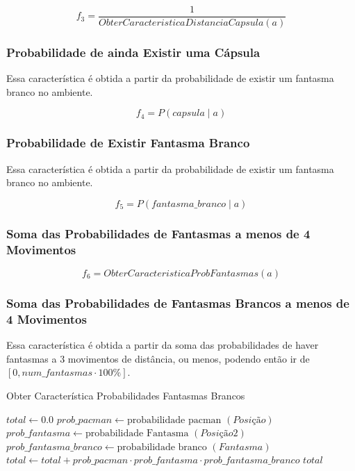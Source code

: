 $$ f_3 = \frac{1}{ObterCaracteristicaDistanciaCapsula \left( a \right)} $$

\subsubsection*{Probabilidade de ainda Existir uma Cápsula}

Essa característica é obtida a partir da probabilidade de existir um fantasma branco no ambiente.

$$ f_4 = P \left( capsula \mid a \right) $$

\subsubsection*{Probabilidade de Existir Fantasma Branco}

Essa característica é obtida a partir da probabilidade de existir um fantasma branco no ambiente.

$$ f_5 = P \left( fantasma\_branco \mid a \right) $$

\subsubsection*{Soma das Probabilidades de Fantasmas a menos de 4 Movimentos}

$$ f_6 = ObterCaracteristicaProbFantasmas \left( a \right) $$

\subsubsection*{Soma das Probabilidades de Fantasmas Brancos a menos de 4 Movimentos}

Essa característica é obtida a partir da soma das probabilidades de haver fantasmas a 3 movimentos de distância, ou menos, podendo então ir de $ \left[ 0, num\_fantasmas \cdot 100\% \right] $.

\begin{algorithm}[H]
	\caption{Obter Característica Probabilidades Fantasmas Brancos} \label{algorithm:ObterCaracteristicaProbabilidadesFantasmasBrancos}
	\begin{algorithmic}[1]
			\State $\textit{total} \gets 0.0 $
						\State $\textit{prob\_pacman} \gets \text{probabilidade pacman } \left( \textit{Posição} \right) $
							\State $\textit{prob\_fantasma} \gets \text{probabilidade Fantasma } \left( \textit{Posição2} \right) $
							\State $\textit{prob\_fantasma\_branco} \gets \text{probabilidade branco } \left( \textit{Fantasma} \right) $
							\State $\textit{total} \gets \textit{total} + \textit{prob\_pacman}  \cdot \textit{prob\_fantasma} \cdot \textit{prob\_fantasma\_branco} $
						\EndFor
					\EndIf
				\EndFor
			\EndFor
			\State \Return $ \textit{total} $
		\EndProcedure
	\end{algorithmic}
\end{algorithm}

